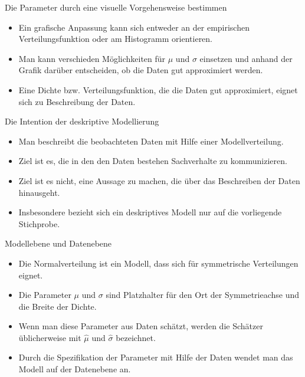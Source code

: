 \documentclass[usenames,dvipsnames,handout]{beamer}
\begin{document}
\begin{frame}{Die Parameter durch eine visuelle Vorgehensweise bestimmen}
\begin{itemize}
\item{Ein grafische Anpassung kann sich entweder
an der empirischen Verteilungsfunktion oder am
Histogramm orientieren.}\pause
\item{Man kann verschieden Möglichkeiten für
$\mu$ und $\sigma$ einsetzen und anhand der Grafik
darüber entscheiden, ob die Daten gut approximiert werden.}\pause
\item{Eine Dichte bzw. Verteilungsfunktion, die die 
Daten gut approximiert, eignet sich zu Beschreibung der Daten.}
\end{itemize}
\end{frame}

\begin{frame}{Die Intention der deskriptive Modellierung}

\begin{itemize}
\item{Man beschreibt die beobachteten Daten mit Hilfe einer Modellverteilung.}\pause
\item{Ziel ist es, die in den den Daten bestehen Sachverhalte zu kommunizieren.}\pause
\item{Ziel ist es nicht, eine Aussage zu machen, die über das Beschreiben der Daten
hinausgeht.}\pause
\item{Insbesondere bezieht sich ein deskriptives Modell nur auf die vorliegende Stichprobe.}
\end{itemize}

\end{frame}

\begin{frame}{Modellebene und Datenebene}

\begin{itemize}
\item{Die Normalverteilung ist ein Modell, dass sich für symmetrische
Verteilungen eignet.}\pause
\item{Die Parameter $\mu$ und $\sigma$ sind Platzhalter
für den Ort der Symmetrieachse und die Breite der Dichte.}\pause
\item{Wenn man diese Parameter aus Daten schätzt,
werden die Schätzer üblicherweise mit $\hat{\mu}$
und $\hat{\sigma}$ bezeichnet.}\pause
\item{Durch die  Spezifikation der Parameter mit Hilfe der
Daten wendet man das Modell auf der Datenebene an.}\pause
\end{itemize}
\end{frame}
\end{document}
